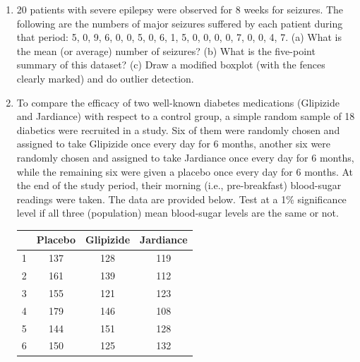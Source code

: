 \documentclass[11pt]{article}
\begin{document}
\begin{enumerate}[label=(\arabic*), leftmargin=*, itemsep=1.15em]
\item 20 patients with severe epilepsy were observed for 8 weeks for seizures. The following are the numbers of major seizures suffered by each patient during that period: 5, 0, 9, 6, 0, 0, 5, 0, 6, 1, 5, 0, 0, 0, 0, 7, 0, 0, 4, 7. (a) What is the mean (or average) number of seizures? (b) What is the five-point summary of this dataset? (c) Draw a modified boxplot (with the fences clearly marked) and do outlier detection.

\item To compare the efficacy of two well-known diabetes medications (Glipizide and Jardiance) with respect to a control group, a simple random sample of 18 diabetics were recruited in a study. Six of them were randomly chosen and assigned to take Glipizide once every day for 6 months, another six were randomly chosen and assigned to take Jardiance once every day for 6 months, while the remaining six were given a placebo once every day for 6 months. At the end of the study period, their morning (i.e., pre-breakfast) blood-sugar readings were taken. The data are provided below. Test at a 1\% significance level if all three (population) mean blood-sugar levels are the same or not.

\begin{center}
\begin{tabular}{c|ccc}
\toprule
 & Placebo & Glipizide & Jardiance \\
\midrule
1 & 137 & 128 & 119 \\
2 & 161 & 139 & 112 \\
3 & 155 & 121 & 123 \\
4 & 179 & 146 & 108 \\
5 & 144 & 151 & 128 \\
6 & 150 & 125 & 132 \\
\bottomrule
\end{tabular}
\end{center}

\end{enumerate}
\end{document}
